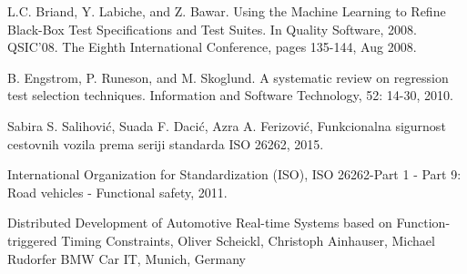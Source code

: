 \documentclass[a4paper]{article}
\begin{document}
\begin{thebibliography}{9}
L.C. Briand, Y. Labiche, and Z. Bawar. Using the Machine Learning to Refine Black-Box Test Specifications and Test Suites. In Quality Software, 2008. QSIC'08. The Eighth International Conference, pages 135-144, Aug 2008. 

B. Engstrom, P. Runeson, and M. Skoglund. A systematic review on regression test selection techniques. Information and Software Technology, 52: 14-30, 2010.

Sabira S. Salihović, Suada F. Dacić, Azra A. Ferizović, Funkcionalna sigurnost cestovnih vozila prema seriji standarda ISO 26262, 2015.

International Organization for Standardization (ISO), ISO 26262-Part 1 - Part 9: Road vehicles - Functional safety, 2011.

Distributed Development of Automotive Real-time Systems based on Function-triggered Timing Constraints, Oliver Scheickl, Christoph Ainhauser, Michael Rudorfer BMW Car IT, Munich, Germany  
\end{thebibliography}
\end{document}
